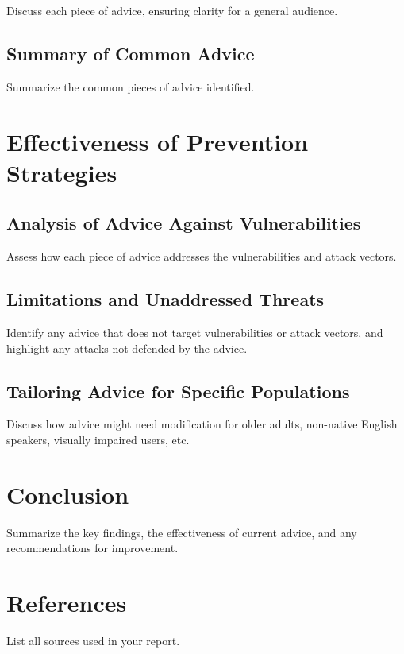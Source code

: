 \documentclass[11pt]{article}
\begin{document}
Discuss each piece of advice, ensuring clarity for a general audience.

\subsection{Summary of Common Advice}
Summarize the common pieces of advice identified.

\section{Effectiveness of Prevention Strategies}
\subsection{Analysis of Advice Against Vulnerabilities}
Assess how each piece of advice addresses the vulnerabilities and attack vectors.

\subsection{Limitations and Unaddressed Threats}
Identify any advice that does not target vulnerabilities or attack vectors, and highlight any attacks not defended by the advice.

\subsection{Tailoring Advice for Specific Populations}
Discuss how advice might need modification for older adults, non-native English speakers, visually impaired users, etc.

\section{Conclusion}
Summarize the key findings, the effectiveness of current advice, and any recommendations for improvement.

\section{References}
List all sources used in your report.
\end{document}
